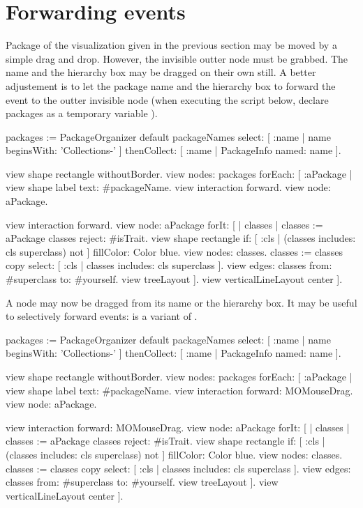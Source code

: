 \documentclass[a4paper,10pt,twoside]{book}
\begin{document}
\section{Forwarding events}
Package of the visualization given in the previous section may be moved by a simple drag and drop. However, the invisible outter node must be grabbed. The name and the hierarchy box may be dragged on their own still. A better adjustement is to let the package name and the hierarchy box to forward the event to the outter invisible node (when executing the script below, declare packages as a temporary variable ).

\begin{code}{}
packages := PackageOrganizer default packageNames
        select: [ :name | name beginsWith: 'Collections-' ] 
        thenCollect:  [ :name | PackageInfo named: name ].

view shape rectangle withoutBorder.
view nodes: packages forEach: [ :aPackage | 
  view shape label text: #packageName.
  view interaction forward.
  view node: aPackage.

  view interaction forward.
  view node: aPackage forIt: [
    | classes |
    classes := aPackage classes reject: #isTrait.
    view shape rectangle 
      if: [ :cls | (classes includes: cls superclass) not ] fillColor: Color blue.
    view nodes: classes.
    classes := classes copy select: [ :cls | classes includes: cls superclass ].
    view edges: classes from: #superclass to: #yourself.
    view treeLayout
  ].
  view verticalLineLayout center
].
\end{code}

A node may now be dragged from its name or the hierarchy box. It may be useful to selectively forward events:  is a variant of .

\begin{code}{}
packages := PackageOrganizer default packageNames
        select: [ :name | name beginsWith: 'Collections-' ] 
        thenCollect:  [ :name | PackageInfo named: name ].

view shape rectangle withoutBorder.
view nodes: packages forEach: [ :aPackage | 
  view shape label text: #packageName.
  view interaction forward: MOMouseDrag.
  view node: aPackage.

  view interaction forward: MOMouseDrag.
  view node: aPackage forIt: [
    | classes |
    classes := aPackage classes reject: #isTrait.
    view shape rectangle 
      if: [ :cls | (classes includes: cls superclass) not ] fillColor: Color blue.
    view nodes: classes.
    classes := classes copy select: [ :cls | classes includes: cls superclass ].
    view edges: classes from: #superclass to: #yourself.
    view treeLayout
  ].
  view verticalLineLayout center
].
\end{code}
\end{document}
